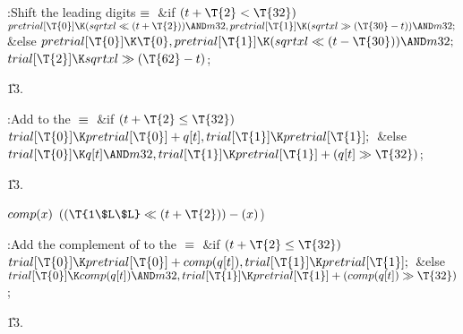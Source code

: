 \Y\B\4:Shift the leading digits\X${}\equiv{}$\6
\&{if} ${}(\|t+\T{2}<\T{32}){}$\1\5
${}\\{pretrial}[\T{0}]\K(\\{sqrtxl}\LL(\|t+\T{2}))\AND\\{m32},\39\\{pretrial}[%
\T{1}]\K(\\{sqrtxl}\GG(\T{30}-\|t))\AND\\{m32};{}$\2\6
\&{else}\1\5
${}\\{pretrial}[\T{0}]\K\T{0},\39\\{pretrial}[\T{1}]\K(\\{sqrtxl}\LL(\|t-%
\T{30}))\AND\\{m32};{}$\2\6
${}\\{trial}[\T{2}]\K\\{sqrtxl}\GG(\T{62}-\|t){}$;\par
\U13.\fi

\B{}:Add  to the \X${}\equiv{}$\6
\&{if} ${}(\|t+\T{2}\Z\T{32}){}$\1\5
${}\\{trial}[\T{0}]\K\\{pretrial}[\T{0}]+\|q[\|t],\39\\{trial}[\T{1}]\K%
\\{pretrial}[\T{1}];{}$\2\6
\&{else}\1\5
${}\\{trial}[\T{0}]\K\|q[\|t]\AND\\{m32},\39\\{trial}[\T{1}]\K\\{pretrial}[%
\T{1}]+(\|q[\|t]\GG\T{32}){}$;\2\par
\U13.\fi

\B\D$\\{comp}(\|x)$ \5
$((\T{1\$L\$L}\LL(\|t+\T{2}))-(\|x){}$)\par
\Y\B\4:Add the complement of  to the \X${}\equiv{}$\6
\&{if} ${}(\|t+\T{2}\Z\T{32}){}$\1\5
${}\\{trial}[\T{0}]\K\\{pretrial}[\T{0}]+\\{comp}(\|q[\|t]),\39\\{trial}[\T{1}]%
\K\\{pretrial}[\T{1}];{}$\2\6
\&{else}\1\5
${}\\{trial}[\T{0}]\K\\{comp}(\|q[\|t])\AND\\{m32},\39\\{trial}[\T{1}]\K%
\\{pretrial}[\T{1}]+(\\{comp}(\|q[\|t])\GG\T{32}){}$;\2\par
\U13.\fi

